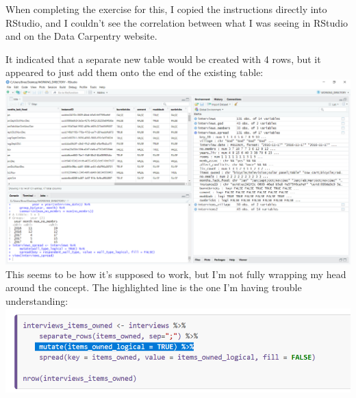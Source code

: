 \documentclass{article}
\begin{document}
{\item When completing the exercise for this, I copied the instructions directly into RStudio, and I couldn’t see the correlation between what I was seeing in RStudio and on the Data Carpentry website.
\item It indicated that a separate new table would be created with 4 rows, but it appeared to just add them onto the end of the existing table:
\includegraphics[width=1.0\textwidth]{rstudio_22.PNG}
This seems to be how it’s supposed to work, but I’m not fully wrapping my head around the concept. The highlighted line is the one I’m having trouble understanding:
\includegraphics[width=1.0\textwidth]{rstudio_23.PNG}}
\end{document}
